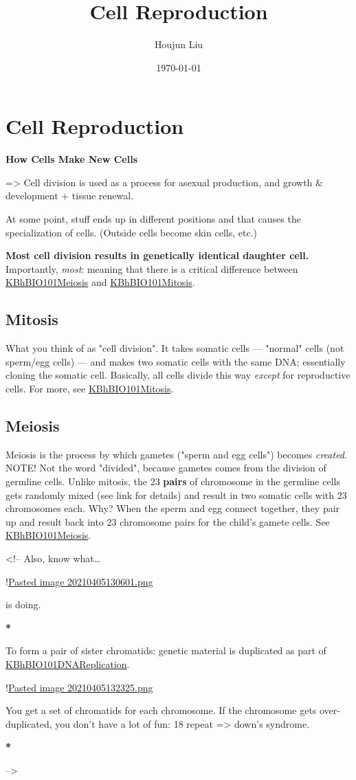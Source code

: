 \documentclass[letterpaper]{article}
\author{Houjun Liu}
\date{\today}
\title{Cell Reproduction}
\renewcommand{\tableofcontents}{}
\begin{document}
\tableofcontents



\section{Cell Reproduction}
\label{sec:orgbd96039}
\textbf{How Cells Make New Cells}

=> Cell division is used as a process for asexual production, and growth
\& development + tissue renewal.

At some point, stuff ends up in different positions and that causes the
specialization of cells. (Outside cells become skin cells, etc.)

\textbf{Most cell division results in genetically identical daughter cell.}
Importantly, \emph{most}: meaning that there is a critical difference between
\href{KBhBIO101Meiosis.org}{KBhBIO101Meiosis} and
\href{KBhBIO101Mitosis.org}{KBhBIO101Mitosis}.

\subsection{Mitosis}
\label{sec:orgd53520f}
What you think of as "cell division". It takes somatic cells ---
"normal" cells (not sperm/egg cells) --- and makes two somatic cells
with the same DNA; essentially cloning the somatic cell. Basically, all
cells divide this way \emph{except} for reproductive cells. For more, see
\href{KBhBIO101Mitosis.org}{KBhBIO101Mitosis}.

\subsection{Meiosis}
\label{sec:org31dd9d1}
Meiosis is the process by which gametes ("sperm and egg cells") becomes
\emph{created}. NOTE! Not the word "divided", because gametes comes from the
division of germline cells. Unlike mitosis, the 23 \textbf{pairs} of chromosome
in the germline cells gets randomly mixed (see link for details) and
result in two somatic cells with 23 chromosomes each. Why? When the
sperm and egg connect together, they pair up and result back into 23
chromosome pairs for the child's gamete cells. See
\href{KBhBIO101Meiosis.org}{KBhBIO101Meiosis}.

\begin{html}
<!--
Also, know what\ldots{}

!\href{Pasted image 20210405130601.png.org}{Pasted image 20210405130601.png}

is doing.

\textbf{*}

To form a pair of sister chromatids: genetic material is duplicated as part of \href{KBhBIO101DNAReplication.org}{KBhBIO101DNAReplication}.

!\href{Pasted image 20210405132325.png.org}{Pasted image 20210405132325.png}

You get a set of chromatids for each chromosome. If the chromosome gets over-duplicated, you don't have a lot of fun: 18 repeat => down's syndrome.

\textbf{*}

-->
\end{html}
\end{document}
